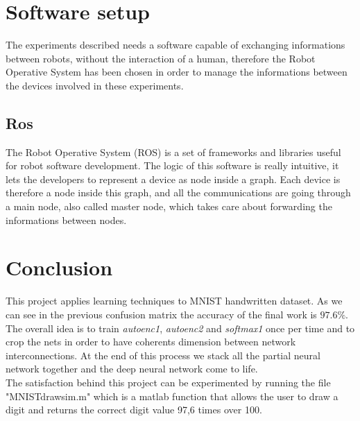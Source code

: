 \section{}
\chapter{Software setup}
The experiments described needs a software capable of exchanging informations between robots, without the interaction of a human, therefore the Robot Operative System has been chosen in order to manage the informations between the devices involved in these experiments.  
\section{Ros}
The Robot Operative System (ROS) is a set of frameworks and libraries useful for robot software development. The logic of this software is really intuitive, it lets the developers to represent a device as node inside a graph. Each device is therefore a node inside this graph, and all the communications are going through a main node, also called master node, which takes care about forwarding the informations between nodes.

\chapter*{Conclusion}
This project applies learning \cite{art:rif.1} techniques to MNIST handwritten dataset. As we can see in the previous confusion matrix the accuracy of the final work is $97.6\%$. The overall idea is to train \emph{autoenc1},  \emph{autoenc2} and \emph{softmax1} once per time and to crop the nets in order to have coherents dimension between network interconnections. At the end of \cite{book:rif.2}this process we stack all the partial neural network together and the deep neural network come to life. \\The satisfaction behind this project can be experimented by running the file "MNIST\textunderscore drawsim.m" which is a matlab function that allows the user to draw a digit and returns the correct digit value 97,6 times over 100.
